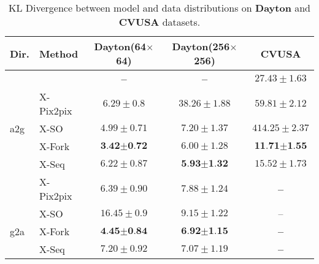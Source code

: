 \documentclass[times,twocolumn,final,authoryear]{elsarticle_modified}
\begin{document}
\begin{table}[t]
 \small
  \centering
\renewcommand{\tabcolsep}{.2mm}  
  
  \caption{\small KL Divergence between model and data distributions on {\bf Dayton} and {\bf CVUSA} datasets.}
  \vspace{-10pt}
  \label{tab:model_data_KL}
    \begin{tabular}{llccc}
        \toprule
       \textbf{Dir.} & \textbf{Method} & \textbf{Dayton(64$\times$64)} & \textbf{Dayton(256$\times$256)} & \textbf{CVUSA}\\
        \midrule
        & \cite{zhai2017crossview} & \textbf{--} & \textbf{--} & $ 27.43 \pm 1.63 $\\
        & X-Pix2pix & $ 6.29 \pm  0.8 $ & $ 38.26 \pm 1.88 $ &   $ 59.81 \pm 2.12 $\\
    a2g & X-SO &  $4.99 \pm 0.71$  & $7.20 \pm 1.37 $ &   $414.25 \pm 2.37$\\  
 & X-Fork &   $ \textbf{3.42} \pm \textbf{0.72} $ & $6.00 \pm 1.28$ &  $ \textbf{11.71} \pm \textbf{1.55} $
\\
    & X-Seq & $ 6.22 \pm 0.87 $ & $ \textbf{5.93} \pm  \textbf{1.32}$ & $ {15.52} \pm {1.73} $\\
    \midrule 
    & X-Pix2pix & $ 6.39 \pm  0.90 $ & $ 7.88 \pm 1.24 $ &   \textbf{--} \\
         & X-SO &  $16.45 \pm 0.9 $ & $ 9.15 \pm 1.22$ &   --\\  

    g2a & X-Fork &   $ \textbf{4.45} \pm \textbf{0.84} $ & $\textbf{6.92} \pm \textbf{1.15} $ & \textbf{--}
\\
    & X-Seq & $ 7.20 \pm 0.92 $ & $ {7.07} \pm  {1.19}$ & \textbf{--}\\
        \bottomrule


    \end{tabular}
\end{table}
\end{document}
